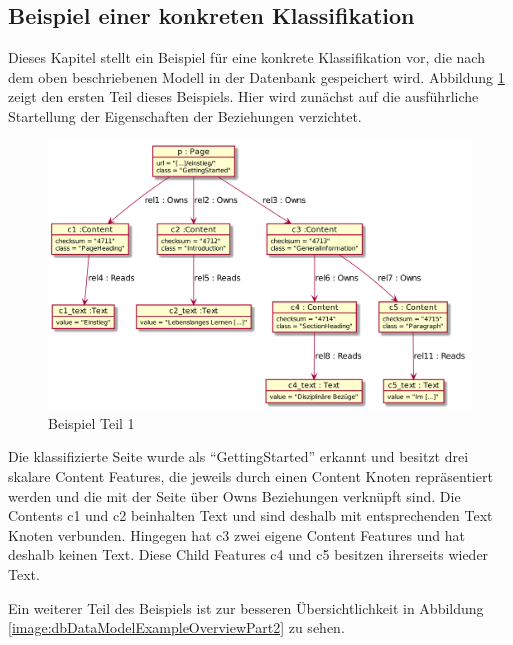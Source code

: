 \subsection{Beispiel einer konkreten Klassifikation}
    \label{section:solutionDetailPersistenceDataModelExample}
    Dieses Kapitel stellt ein Beispiel für eine konkrete Klassifikation vor,
    die nach dem oben beschriebenen Modell in der Datenbank gespeichert wird.
    Abbildung \ref{image:dbDataModelExampleOverviewPart1} zeigt den ersten Teil dieses Beispiels.
    Hier wird zunächst auf die ausführliche Startellung der Eigenschaften der Beziehungen verzichtet.

    \begin{figure}[htb]
        \centering
        \includegraphics[scale=\imageScalingFactor]{../resources/db-data-model/example/example_part1.png}
        \caption{Beispiel Teil 1}
        \label{image:dbDataModelExampleOverviewPart1}
    \end{figure}

    Die klassifizierte Seite wurde als "`GettingStarted"' erkannt und besitzt drei skalare Content Features,
    die jeweils durch einen Content Knoten repräsentiert werden und die mit der Seite über
    Owns Beziehungen verknüpft sind.
    Die Contents c1 und c2 beinhalten Text und sind deshalb mit entsprechenden Text Knoten verbunden.
    Hingegen hat c3 zwei eigene Content Features und hat deshalb keinen Text. %
    Diese Child Features c4 und c5 besitzen ihrerseits wieder Text.

    Ein weiterer Teil des Beispiels ist zur besseren Übersichtlichkeit in
    Abbildung \ref{image:dbDataModelExampleOverviewPart2} zu sehen.


